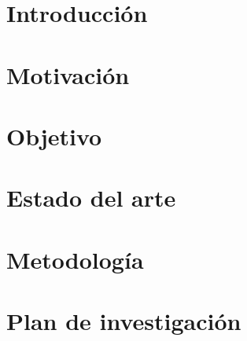 \chapter{Introducción}
\label{chapter:introduccion}


\chapter{Motivación}
\label{chapter:motivacion}


\chapter{Objetivo}
\label{chapter:objetivo}


\chapter{Estado del arte}
\label{chapter:estadoarte}


\chapter{Metodología}
\label{chapter:metodologia}


\chapter{Plan de investigación}
\label{chapter:planificacion}
